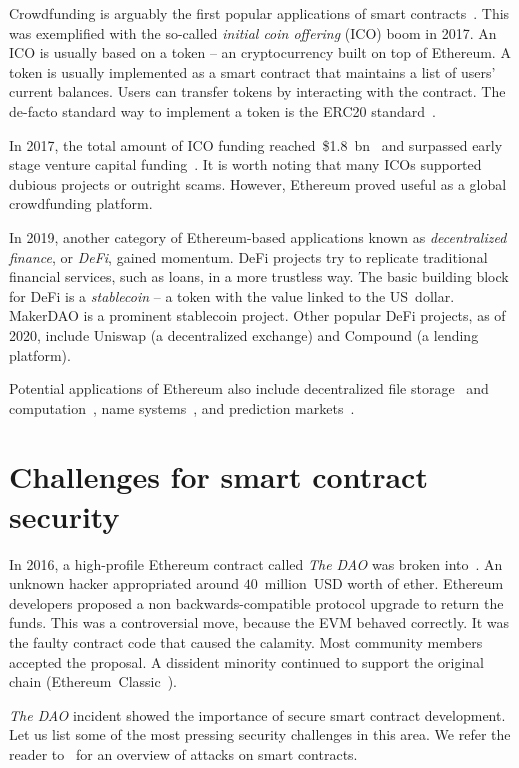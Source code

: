 Crowdfunding is arguably the first popular applications of smart contracts~\cite{McAdams2017}.
This was exemplified with the so-called \textit{initial coin offering} (ICO) boom in 2017.
An ICO is usually based on a token -- an cryptocurrency built on top of Ethereum.
A token is usually implemented as a smart contract that maintains a list of users' current balances.
Users can transfer tokens by interacting with the contract.
The de-facto standard way to implement a token is the ERC20 standard~\cite{Victor2019}.

In 2017, the total amount of ICO funding reached~\$1.8~bn~\cite{CoindeakICOTracker} and surpassed early stage venture capital funding~\cite{Sunnarborg2017}.
It is worth noting that many ICOs supported dubious projects or outright scams.
However, Ethereum proved useful as a global crowdfunding platform.

In 2019, another category of Ethereum-based applications known as \textit{decentralized finance}, or \textit{DeFi}, gained momentum.
DeFi projects try to replicate traditional financial services, such as loans, in a more trustless way.
The basic building block for DeFi is a \textit{stablecoin} -- a token with the value linked to the US~dollar.
MakerDAO is a prominent stablecoin project.
Other popular DeFi projects, as of 2020, include Uniswap (a decentralized exchange) and Compound (a lending platform).

Potential applications of Ethereum also include decentralized file storage~\cite{Storj} and computation~\cite{Golem}, name systems~\cite{ENS}, and prediction markets~\cite{Augur, Gnosis}.


\section{Challenges for smart contract security}

In 2016, a high-profile Ethereum contract called \textit{The DAO} was broken into~\cite{Sirer2016}.
An unknown hacker appropriated around $40$~million~USD worth of ether.
Ethereum developers proposed a non backwards-compatible protocol upgrade to return the funds.
This was a controversial move, because the EVM behaved correctly.
It was the faulty contract code that caused the calamity.
Most community members accepted the proposal.
A dissident minority continued to support the original chain (Ethereum~Classic~\cite{EthereumClassic}).

\textit{The DAO} incident showed the importance of secure smart contract development.
Let us list some of the most pressing security challenges in this area.
We refer the reader to~\cite{Delmolino2016, Atzei2017} for an overview of attacks on smart contracts.


